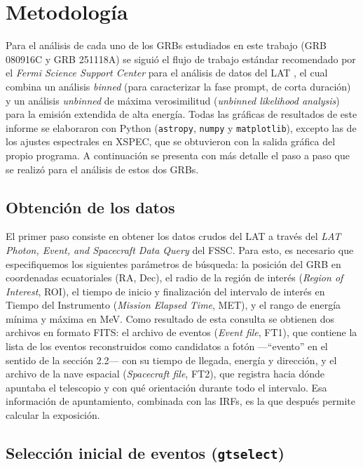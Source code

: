 \section{Metodología}

Para el análisis de cada uno de los GRBs estudiados en este trabajo (GRB 080916C y GRB 251118A) se siguió el flujo de trabajo estándar recomendado por el \textit{Fermi Science Support Center} para el análisis de datos del LAT \cite{FSSCCicerone}, el cual combina un análisis \textit{binned} (para caracterizar la fase prompt, de corta duración) y un análisis \textit{unbinned} de máxima verosimilitud (\textit{unbinned likelihood analysis}) para la emisión extendida de alta energía. Todas las gráficas de resultados de este informe se elaboraron con Python (\texttt{astropy}, \texttt{numpy} y \texttt{matplotlib}), excepto las de los ajustes espectrales en XSPEC, que se obtuvieron con la salida gráfica del propio programa. A continuación se presenta con más detalle el paso a paso que se realizó para el análisis de estos dos GRBs.

\subsection{Obtención de los datos}

El primer paso consiste en obtener los datos crudos del LAT a través del \textit{LAT Photon, Event, and Spacecraft Data Query} del FSSC. Para esto, es necesario que especifiquemos los siguientes parámetros de búsqueda: la posición del GRB en coordenadas ecuatoriales (RA, Dec), el radio de la región de interés (\textit{Region of Interest}, ROI), el tiempo de inicio y finalización del intervalo de interés en Tiempo del Instrumento (\textit{Mission Elapsed Time}, MET), y el rango de energía mínima y máxima en MeV. Como resultado de esta consulta se obtienen dos archivos en formato FITS: el archivo de eventos (\textit{Event file}, FT1), que contiene la lista de los eventos reconstruidos como candidatos a fotón —``evento'' en el sentido de la sección 2.2— con su tiempo de llegada, energía y dirección, y el archivo de la nave espacial (\textit{Spacecraft file}, FT2), que registra hacia dónde apuntaba el telescopio y con qué orientación durante todo el intervalo. Esa información de apuntamiento, combinada con las IRFs, es la que después permite calcular la exposición.

\subsection{Selección inicial de eventos (\texttt{gtselect})}

